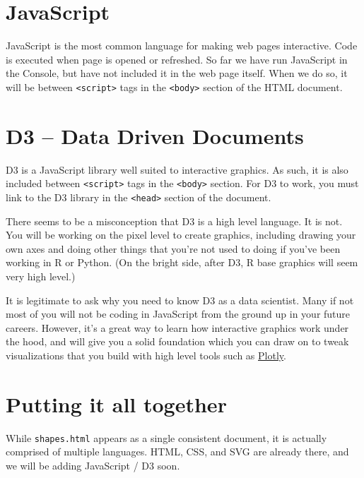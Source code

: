 \documentclass[]{book}
\begin{document}
\hypertarget{javascript}{%
\section{JavaScript}\label{javascript}}

JavaScript is the most common language for making web pages interactive. Code is executed when page is opened or refreshed. So far we have run JavaScript in the Console, but have not included it in the web page itself. When we do so, it will be between \texttt{\textless{}script\textgreater{}} tags in the \texttt{\textless{}body\textgreater{}} section of the HTML document.

\hypertarget{d3-data-driven-documents}{%
\section{D3 -- Data Driven Documents}\label{d3-data-driven-documents}}

D3 is a JavaScript library well suited to interactive graphics. As such, it is also included between \texttt{\textless{}script\textgreater{}} tags in the \texttt{\textless{}body\textgreater{}} section. For D3 to work, you must link to the D3 library in the \texttt{\textless{}head\textgreater{}} section of the document.

There seems to be a misconception that D3 is a high level language. It is not. You will be working on the pixel level to create graphics, including drawing your own axes and doing other things that you're not used to doing if you've been working in R or Python. (On the bright side, after D3, R base graphics will seem very high level.)

It is legitimate to ask why you need to know D3 as a data scientist. Many if not most of you will not be coding in JavaScript from the ground up in your future careers. However, it's a great way to learn how interactive graphics work under the hood, and will give you a solid foundation which you can draw on to tweak visualizations that you build with high level tools such as \href{https://plot.ly/}{Plotly}.

\hypertarget{putting-it-all-together}{%
\section{Putting it all together}\label{putting-it-all-together}}

While \texttt{shapes.html} appears as a single consistent document, it is actually comprised of multiple languages. HTML, CSS, and SVG are already there, and we will be adding JavaScript / D3 soon.
\end{document}
